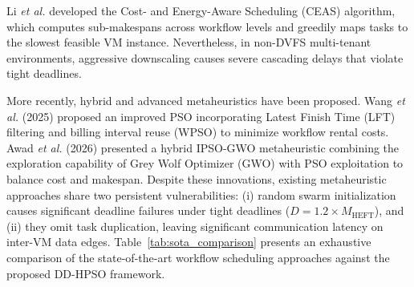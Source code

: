 \documentclass[journal]{IEEEtran}
\begin{document}
Li \textit{et al.} \cite{ceas2018li} developed the Cost- and Energy-Aware Scheduling (CEAS) algorithm, which computes sub-makespans across workflow levels and greedily maps tasks to the slowest feasible VM instance. Nevertheless, in non-DVFS multi-tenant environments, aggressive downscaling causes severe cascading delays that violate tight deadlines.

More recently, hybrid and advanced metaheuristics have been proposed. Wang \textit{et al.} (2025) \cite{wpso2025wang} proposed an improved PSO incorporating Latest Finish Time (LFT) filtering and billing interval reuse (WPSO) to minimize workflow rental costs. Awad \textit{et al.} (2026) \cite{awad2026ipso} presented a hybrid IPSO-GWO metaheuristic combining the exploration capability of Grey Wolf Optimizer (GWO) with PSO exploitation to balance cost and makespan. Despite these innovations, existing metaheuristic approaches share two persistent vulnerabilities: (i) random swarm initialization causes significant deadline failures under tight deadlines ($D = 1.2 \times M_{\text{HEFT}}$), and (ii) they omit task duplication, leaving significant communication latency on inter-VM data edges. Table~\ref{tab:sota_comparison} presents an exhaustive comparison of the state-of-the-art workflow scheduling approaches against the proposed DD-HPSO framework.
\end{document}
